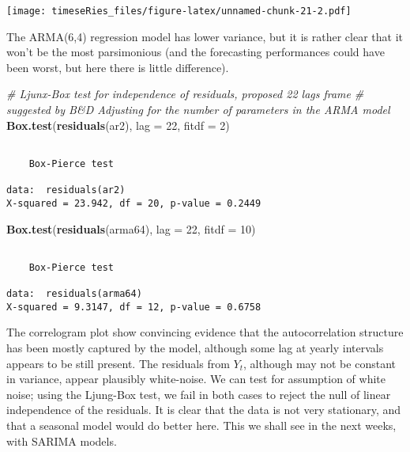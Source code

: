 \documentclass[]{book}
\newenvironment{Shaded}{\begin{snugshade}}{\end{snugshade}}
\newcommand{\KeywordTok}[1]{\textcolor[rgb]{0.13,0.29,0.53}{\textbf{#1}}}
\newcommand{\DataTypeTok}[1]{\textcolor[rgb]{0.13,0.29,0.53}{#1}}
\newcommand{\DecValTok}[1]{\textcolor[rgb]{0.00,0.00,0.81}{#1}}
\newcommand{\CommentTok}[1]{\textcolor[rgb]{0.56,0.35,0.01}{\textit{#1}}}
\newcommand{\NormalTok}[1]{#1}
\begin{document}
\texttt{[image: timeseRies\_files/figure-latex/unnamed-chunk-21-2.pdf]}

The ARMA(6,4) regression model has lower variance, but it is rather
clear that it won't be the most parsimonious (and the forecasting
performances could have been worst, but here there is little
difference).

\begin{Shaded}
\begin{Highlighting}[]
\CommentTok{# Ljunx-Box test for independence of residuals, proposed 22 lags frame}
\CommentTok{# suggested by B&D Adjusting for the number of parameters in the ARMA model}
\KeywordTok{Box.test}\NormalTok{(}\KeywordTok{residuals}\NormalTok{(ar2), }\DataTypeTok{lag =} \DecValTok{22}\NormalTok{, }\DataTypeTok{fitdf =} \DecValTok{2}\NormalTok{)}
\end{Highlighting}
\end{Shaded}

\begin{verbatim}

    Box-Pierce test

data:  residuals(ar2)
X-squared = 23.942, df = 20, p-value = 0.2449
\end{verbatim}

\begin{Shaded}
\begin{Highlighting}[]
\KeywordTok{Box.test}\NormalTok{(}\KeywordTok{residuals}\NormalTok{(arma64), }\DataTypeTok{lag =} \DecValTok{22}\NormalTok{, }\DataTypeTok{fitdf =} \DecValTok{10}\NormalTok{)}
\end{Highlighting}
\end{Shaded}

\begin{verbatim}

    Box-Pierce test

data:  residuals(arma64)
X-squared = 9.3147, df = 12, p-value = 0.6758
\end{verbatim}

The correlogram plot show convincing evidence that the autocorrelation
structure has been mostly captured by the model, although some lag at
yearly intervals appears to be still present. The residuals from
\(Y_t\), although may not be constant in variance, appear plausibly
white-noise. We can test for assumption of white noise; using the
Ljung-Box test, we fail in both cases to reject the null of linear
independence of the residuals. It is clear that the data is not very
stationary, and that a seasonal model would do better here. This we
shall see in the next weeks, with SARIMA models.
\end{document}
